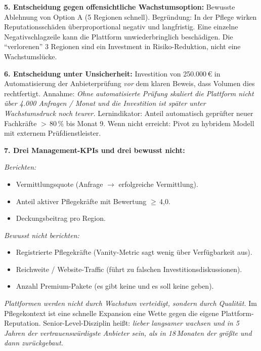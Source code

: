 \documentclass[11pt,a4paper,oneside]{article}
\begin{document}
\begin{loesungbox}
\textbf{5. Entscheidung gegen offensichtliche Wachstumsoption:}
Bewusste Ablehnung von Option A (5 Regionen schnell). Begründung: In der Pflege wirken Reputationsschäden überproportional negativ und langfristig. Eine einzelne Negativschlagzeile kann die Plattform unwiederbringlich beschädigen. Die ``verlorenen'' 3 Regionen sind ein Investment in Risiko-Reduktion, nicht eine Wachstumslücke.

\textbf{6. Entscheidung unter Unsicherheit:}
Investition von 250.000\,\euro{} in Automatisierung der Anbieterprüfung \emph{vor} dem klaren Beweis, dass Volumen dies rechtfertigt. Annahme: \emph{Ohne automatisierte Prüfung skaliert die Plattform nicht über 4.000 Anfragen / Monat \textendash{} und die Investition ist später unter Wachstumsdruck noch teurer.} Lernindikator: Anteil automatisch geprüfter neuer Fachkräfte $>$\,80\,\% bis Monat 9. Wenn nicht erreicht: Pivot zu hybridem Modell mit externem Prüfdienstleister.

\textbf{7. Drei Management-KPIs \textendash{} und drei bewusst nicht:}

\emph{Berichten:}
\begin{itemize}
  \item Vermittlungsquote (Anfrage $\rightarrow$ erfolgreiche Vermittlung).
  \item Anteil aktiver Pflegekräfte mit Bewertung $\geq$\,4,0.
  \item Deckungsbeitrag pro Region.
\end{itemize}

\emph{Bewusst nicht berichten:}
\begin{itemize}
  \item Registrierte Pflegekräfte (Vanity-Metric \textendash{} sagt wenig über Verfügbarkeit aus).
  \item Reichweite / Website-Traffic (führt zu falschen Investitionsdiskussionen).
  \item Anzahl Premium-Pakete (es gibt keine \textendash{} und es soll keine geben).
\end{itemize}

\begin{merkbox}
\emph{Plattformen werden nicht durch Wachstum verteidigt, sondern durch Qualität.} Im Pflegekontext ist eine schnelle Expansion eine Wette gegen die eigene Plattform-Reputation. Senior-Level-Disziplin heißt: \emph{lieber langsamer wachsen und in 5 Jahren der vertrauenswürdigste Anbieter sein, als in 18\,Monaten der größte und dann zurückgebaut.}
\end{merkbox}
\end{loesungbox}
\end{document}
